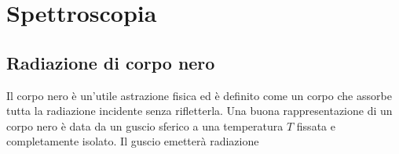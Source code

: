 \chapter{Spettroscopia}
\section{Radiazione di corpo nero}
    Il corpo nero è un'utile astrazione fisica ed è definito come un corpo che assorbe tutta la radiazione incidente senza rifletterla. Una buona rappresentazione di un corpo nero è data da un guscio sferico a una temperatura $T$ fissata e completamente isolato. Il guscio emetterà radiazione 